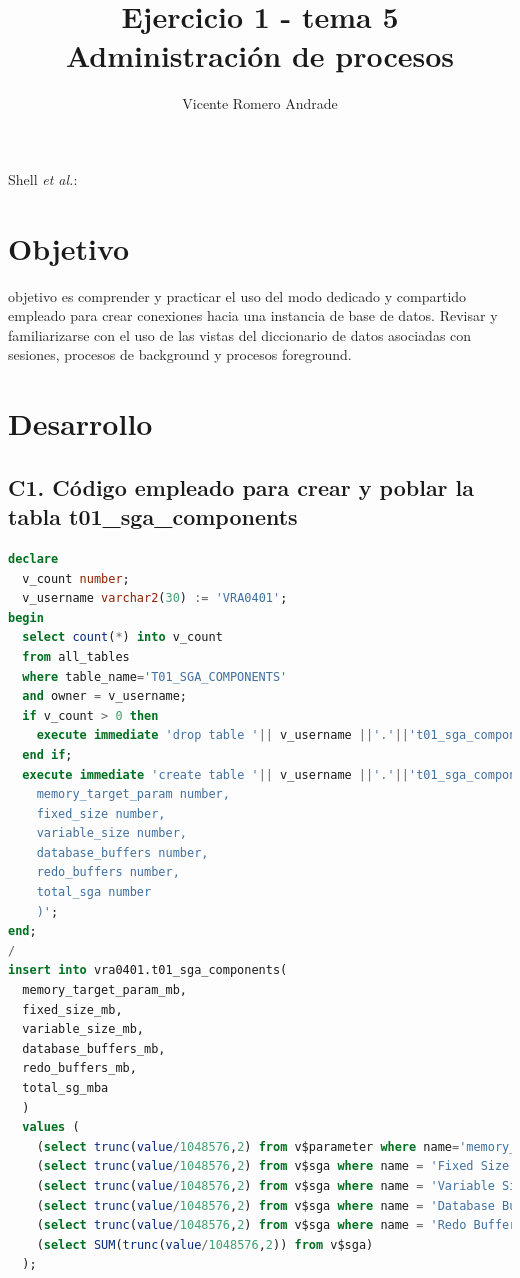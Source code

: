 \documentclass[journal]{IEEEtran}
\begin{document}
\title{Ejercicio 1 - tema 5 \\ Administración de procesos}
%
\author{Vicente Romero Andrade}

%
{Shell \MakeLowercase{\textit{et al.}}: }

\maketitle


\IEEEpeerreviewmaketitle

\section{Objetivo}

 objetivo es comprender y practicar el uso del modo dedicado y  
compartido empleado para crear conexiones hacia una instancia de base de datos.    
Revisar y familiarizarse con el uso de las vistas del diccionario de datos asociadas con sesiones, 
procesos de background y procesos foreground.

\section{Desarrollo}
\subsection{C1.  Código empleado para crear y poblar la tabla t01\_sga\_components}
\begin{lstlisting}[language=sql, caption=t01\_sga\_components,label={lst:codigo1}]
declare
  v_count number;
  v_username varchar2(30) := 'VRA0401';
begin
  select count(*) into v_count
  from all_tables
  where table_name='T01_SGA_COMPONENTS'
  and owner = v_username;
  if v_count > 0 then
    execute immediate 'drop table '|| v_username ||'.'||'t01_sga_components';
  end if;
  execute immediate 'create table '|| v_username ||'.'||'t01_sga_components(
    memory_target_param number,
    fixed_size number,
    variable_size number, 
    database_buffers number, 
    redo_buffers number,
    total_sga number
    )';
end;
/
insert into vra0401.t01_sga_components(
  memory_target_param_mb,
  fixed_size_mb, 
  variable_size_mb, 
  database_buffers_mb, 
  redo_buffers_mb,
  total_sg_mba
  ) 
  values (
    (select trunc(value/1048576,2) from v$parameter where name='memory_target'),
    (select trunc(value/1048576,2) from v$sga where name = 'Fixed Size'),
    (select trunc(value/1048576,2) from v$sga where name = 'Variable Size'),
    (select trunc(value/1048576,2) from v$sga where name = 'Database Buffers'),
    (select trunc(value/1048576,2) from v$sga where name = 'Redo Buffers'),
    (select SUM(trunc(value/1048576,2)) from v$sga)
  );
\end{lstlisting}
\end{document}
